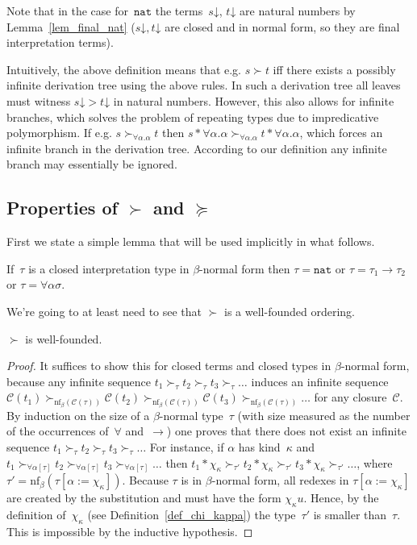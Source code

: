 \documentclass[runningheads,a4paper]{llncs}
\newcommand{\cl}{\mathcal{C}}
\newcommand{\nf}{\mathrm{nf}}
\newcommand{\arrtype}{\rightarrow}
\newcommand{\tapp}[2]{#1 * #2}
\newcommand{\subst}[2]{#1:=#2}
\newcommand{\nat}{\mathtt{nat}}
\newcommand{\da}{\mathord{\downarrow}}
\begin{document}
Note that in the case for~$\nat$ the terms~$s\da$, $t\da$ are natural
numbers by Lemma~\ref{lem_final_nat} ($s\da,t\da$ are closed and in
normal form, so they are final interpretation terms).

Intuitively, the above definition means that e.g. $s \succ t$ iff
there exists a possibly infinite derivation tree using the above
rules. In such a derivation tree all leaves must witness $s\da > t\da$
in natural numbers. However, this also allows for infinite branches,
which solves the problem of repeating types due to impredicative
polymorphism. If e.g.  $s \succ_{\forall \alpha . \alpha} t$ then
$\tapp{s}{\forall\alpha.\alpha} \succ_{\forall \alpha . \alpha}
\tapp{t}{\forall\alpha.\alpha}$, which forces an infinite branch in
the derivation tree. According to our definition any infinite branch
may essentially be ignored.

\subsection{Properties of $\succ$ and $\succeq$}

First we state a simple lemma that will be used implicitly in what
follows.

\begin{lemma}
  If~$\tau$ is a closed interpretation type in $\beta$-normal form
  then $\tau = \nat$ or $\tau = \tau_1\arrtype\tau_2$ or $\tau =
  \forall\alpha\sigma$.
\end{lemma}

We're going to at least need to see that $\succ$ is a well-founded
ordering.

\begin{lemma}
  $\succ$ is well-founded.
\end{lemma}

\begin{proof}
  It suffices to show this for closed terms and closed types in
  $\beta$-normal form, because any infinite sequence $t_1 \succ_\tau
  t_2 \succ_\tau t_3 \succ_\tau \ldots$ induces an infinite sequence
  $\cl(t_1) \succ_{\nf_\beta(\cl(\tau))} \cl(t_2)
  \succ_{\nf_\beta(\cl(\tau))} \cl(t_3) \succ_{\nf_\beta(\cl(\tau))}
  \ldots$ for any closure~$\cl$. By induction on the size of a
  $\beta$-normal type~$\tau$ (with size measured as the number of the
  occurrences of~$\forall$ and~$\arrtype$) one proves that there does
  not exist an infinite sequence $t_1 \succ_\tau t_2 \succ_\tau t_3
  \succ_\tau \ldots$ For instance, if $\alpha$ has kind~$\kappa$ and
  $t_1 \succ_{\forall\alpha[\tau]} t_2 \succ_{\forall\alpha[\tau]} t_3
  \succ_{\forall\alpha[\tau]} \ldots$ then $\tapp{t_1}{\chi_\kappa}
  \succ_{\tau'} \tapp{t_2}{\chi_\kappa} \succ_{\tau'}
  \tapp{t_3}{\chi_\kappa} \succ_{\tau'} \ldots$, where
  $\tau'=\nf_\beta(\tau[\subst{\alpha}{\chi_\kappa}])$. Because $\tau$
  is in $\beta$-normal form, all redexes in
  $\tau[\subst{\alpha}{\chi_\kappa}]$ are created by the substitution
  and must have the form $\chi_\kappa u$. Hence, by the definition
  of~$\chi_\kappa$ (see Definition~\ref{def_chi_kappa}) the
  type~$\tau'$ is smaller than~$\tau$. This is impossible by the
  inductive hypothesis.
\end{proof}
\end{document}
